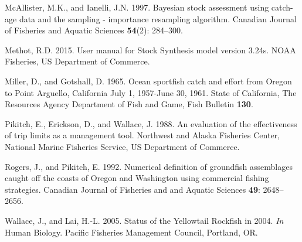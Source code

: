 \documentclass[12pt,]{article}
\begin{document}
\hypertarget{ref-McAllister1997}{}
McAllister, M.K., and Ianelli, J.N. 1997. Bayesian stock assessment
using catch-age data and the sampling - importance resampling algorithm.
Canadian Journal of Fisheries and Aquatic Sciences \textbf{54}(2):
284--300.

\hypertarget{ref-Methot2015}{}
Methot, R.D. 2015. User manual for Stock Synthesis model version 3.24s.
NOAA Fisheries, US Department of Commerce.

\hypertarget{ref-Miller1965}{}
Miller, D., and Gotshall, D. 1965. Ocean sportfish catch and effort from
Oregon to Point Arguello, California July 1, 1957-June 30, 1961. State
of California, The Resources Agency Department of Fish and Game, Fish
Bulletin \textbf{130}.

\hypertarget{ref-Pikitch1988}{}
Pikitch, E., Erickson, D., and Wallace, J. 1988. An evaluation of the
effectiveness of trip limits as a management tool. Northwest and Alaska
Fisheries Center, National Marine Fisheries Service, US Department of
Commerce.

\hypertarget{ref-Rogers1992}{}
Rogers, J., and Pikitch, E. 1992. Numerical definition of groundfish
assemblages caught off the coasts of Oregon and Washington using
commercial fishing strategies. Canadian Journal of Fisheries and and
Aquatic Sciences \textbf{49}: 2648--2656.

\hypertarget{ref-Wallace2005}{}
Wallace, J., and Lai, H.-L. 2005. Status of the Yellowtail Rockfish in
2004. \emph{In} Human Biology. Pacific Fisheries Management Council,
Portland, OR.
\end{document}

